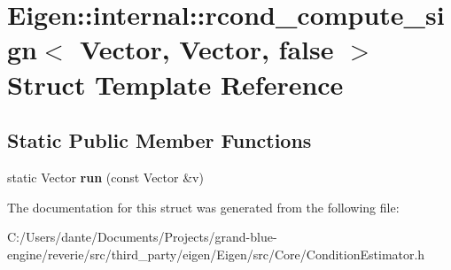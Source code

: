 \hypertarget{struct_eigen_1_1internal_1_1rcond__compute__sign_3_01_vector_00_01_vector_00_01false_01_4}{}\section{Eigen\+::internal\+::rcond\+\_\+compute\+\_\+sign$<$ Vector, Vector, false $>$ Struct Template Reference}
\label{struct_eigen_1_1internal_1_1rcond__compute__sign_3_01_vector_00_01_vector_00_01false_01_4}
\subsection*{Static Public Member Functions}
\begin{DoxyCompactItemize}
\item 
\mbox{\label{struct_eigen_1_1internal_1_1rcond__compute__sign_3_01_vector_00_01_vector_00_01false_01_4_a74f76e8aa6893b263c4531e40094cbf2}} 
static Vector {\bfseries run} (const Vector \&v)
\end{DoxyCompactItemize}


The documentation for this struct was generated from the following file\+:\begin{DoxyCompactItemize}
\item 
C\+:/\+Users/dante/\+Documents/\+Projects/grand-\/blue-\/engine/reverie/src/third\+\_\+party/eigen/\+Eigen/src/\+Core/Condition\+Estimator.\+h\end{DoxyCompactItemize}
